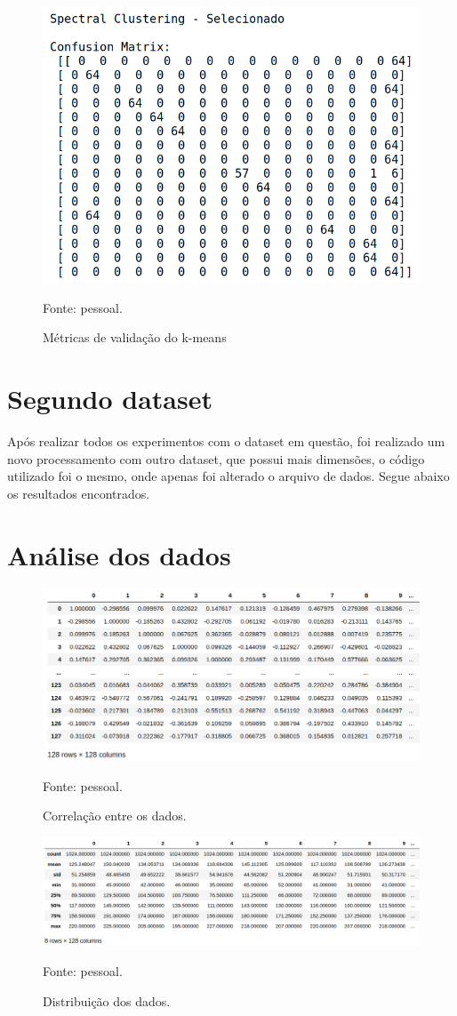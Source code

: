 \begin{figure}[h]
	\centering
	\includegraphics[width=0.7\linewidth]{images/resultSpectralSelecionado}
	\caption{Métricas de validação do k-means}
	Fonte: pessoal.
	\label{fig:resultSpectralSelecionado}
\end{figure}


\section{Segundo dataset}

Após realizar todos os experimentos com o dataset em questão, foi realizado um novo processamento com outro dataset, que possui mais dimensões, o código utilizado foi o mesmo, onde apenas foi alterado o arquivo de dados. Segue abaixo os resultados encontrados.


\section{Análise dos dados}

\begin{figure}[h]
	\centering
	\includegraphics[width=0.7\linewidth]{images/dim128_corr}
	\caption{Correlação entre os dados.}
	Fonte: pessoal.
	\label{fig:dim128-correlacao}
\end{figure}


\begin{figure}[h]
	\centering
	\includegraphics[width=0.7\linewidth]{images/dim128_describe}
	\caption{Distribuição dos dados.}
	Fonte: pessoal.
	\label{fig:dim128-describe}
\end{figure}

